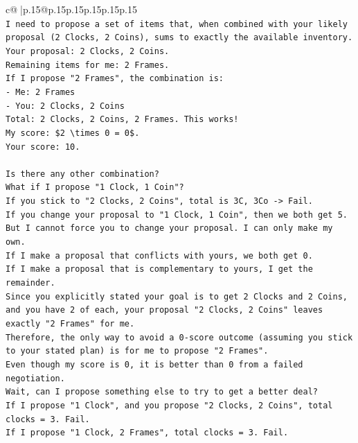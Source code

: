 \documentclass{article}
\begin{document}
{\begin{supertabular}{c@{$\;$}|p{.15\linewidth}@{}p{.15\linewidth}p{.15\linewidth}p{.15\linewidth}p{.15\linewidth}p{.15\linewidth}}
{{{\\ 
\texttt{I need to propose a set of items that, when combined with your likely proposal (2 Clocks, 2 Coins), sums to exactly the available inventory.} \\
\texttt{Your proposal: 2 Clocks, 2 Coins.} \\
\texttt{Remaining items for me: 2 Frames.} \\
\texttt{If I propose "2 Frames", the combination is:} \\
\texttt{{-} Me: 2 Frames} \\
\texttt{{-} You: 2 Clocks, 2 Coins} \\
\texttt{Total: 2 Clocks, 2 Coins, 2 Frames. This works!} \\
\texttt{My score: \$2 \textbackslash{}times 0 = 0\$.} \\
\texttt{Your score: 10.} \\
\\ 
\texttt{Is there any other combination?} \\
\texttt{What if I propose "1 Clock, 1 Coin"?} \\
\texttt{If you stick to "2 Clocks, 2 Coins", total is 3C, 3Co {-}> Fail.} \\
\texttt{If you change your proposal to "1 Clock, 1 Coin", then we both get 5.} \\
\texttt{But I cannot force you to change your proposal. I can only make my own.} \\
\texttt{If I make a proposal that conflicts with yours, we both get 0.} \\
\texttt{If I make a proposal that is complementary to yours, I get the remainder.} \\
\texttt{Since you explicitly stated your goal is to get 2 Clocks and 2 Coins, and you have 2 of each, your proposal "2 Clocks, 2 Coins" leaves exactly "2 Frames" for me.} \\
\texttt{Therefore, the only way to avoid a 0{-}score outcome (assuming you stick to your stated plan) is for me to propose "2 Frames".} \\
\texttt{Even though my score is 0, it is better than 0 from a failed negotiation.} \\
\texttt{Wait, can I propose something else to try to get a better deal?} \\
\texttt{If I propose "1 Clock", and you propose "2 Clocks, 2 Coins", total clocks = 3. Fail.} \\
\texttt{If I propose "1 Clock, 2 Frames", total clocks = 3. Fail.} \\
}}}
\end{supertabular}}
\end{document}
